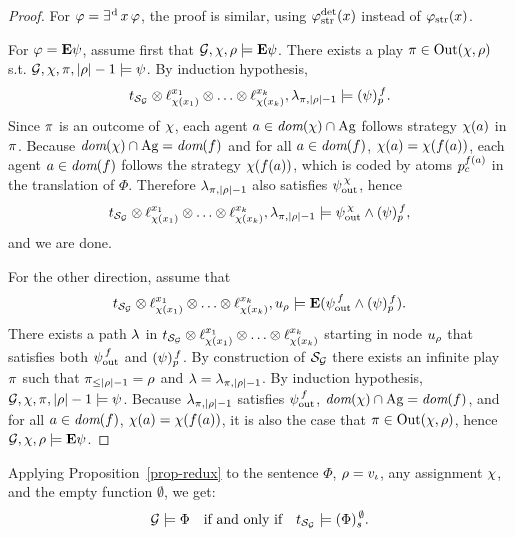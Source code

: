 \begin{proof}
For $\phi=\existsd\var\,\phi$, the proof is similar, using $\phistratdet$
instead of $\phistrat$.

 
\halfline
For $\phi=\Eout\psi$,
assume first that $\CGS,\assign,{\fplay}\models\E\psi$. 
There exists a play $\iplay\in\out(\assign,\fplay)$ s.t.
$\CGS,\assign,\iplay,|\fplay|-1\modelsSL \psi$. By induction
hypothesis,
\[\unfold[\KS_{\CGS}]{\sstate_{\pos_\init}}\prodlab
  \stratlab[\assign(\var_1)]{\var_1}\prodlab\ldots \prodlab
  \stratlab[\assign(\var_k)]{\var_k},\tpath_{\iplay,|\fplay|-1} \modelst
  \trp[f]{\psi}.\] Since $\iplay$ is an outcome of $\assign$, each agent $a\in\dom(\assign)\inter\Agf$ 
follows strategy $\assign(a)$ in $\iplay$.
Because  $\dom(\assign)\inter \Agf=\dom(f)$ and for all $a \in \dom(f)$,
  $\assign(a) = \assign(f(a))$, each agent $a\in\dom(f)$ follows
the  strategy $\assign(f(a))$, which is coded by atoms
$p_\mov^{f(\ag)}$ in the translation of $\Phi$. Therefore $\tpath_{\iplay,|\fplay|-1}$ also
satisfies $\psiout$, hence \[\unfold[\KS_{\CGS}]{\sstate_{\pos_\init}}\prodlab
  \stratlab[\assign(\var_1)]{\var_1}\prodlab\ldots \prodlab
  \stratlab[\assign(\var_k)]{\var_k},\tpath_{\iplay,|\fplay|-1} \modelst
  \psiout \et   \trp[f]{\psi},\] and we are done.

  For the other direction, assume that 
  \[\unfold[\KS_{\CGS}]{\sstate_{\pos_\init}}\prodlab
  \stratlab[\assign(\var_1)]{\var_1}\prodlab\ldots \prodlab
  \stratlab[\assign(\var_k)]{\var_k},\noeud_\fplay \modelst
  \E(\psiout[f] \et   \trp[f]{\psi}).\]
There exists a path $\tpath$ in $\unfold[\KS_{\CGS}]{\sstate_{\pos_\init}}\prodlab
  \stratlab[\assign(\var_1)]{\var_1}\prodlab\ldots \prodlab
  \stratlab[\assign(\var_k)]{\var_k}$ starting in
node $\noeud_\fplay$ that satisfies both $\psiout[f]$ and $\trp[f]{\psi}$.
By construction of $\KS_{\CGS}$ there exists an infinite play $\iplay$
such that $\iplay_{\leq |\fplay|-1}=\fplay$ and $\tpath=\tpath_{\iplay,|\fplay|-1}$.
By induction hypothesis, $\CGS,\assign,\iplay,|\fplay|-1 \modelsSL \psi$.
Because $\tpath_{\iplay,|\fplay|-1}$ satisfies $\psiout[f]$, $\dom(\assign)\inter \Agf=\dom(f)$, and for all $a \in \dom(f)$,
  $\assign(a) = \assign(f(a))$, it is also the case that
  $\iplay\in\out(\assign,\fplay)$, 
hence  $\CGS,\assign,\fplay \modelsSL \Eout\psi$.

 \end{proof}
 
 Applying Proposition~\ref{prop-redux} to the sentence $\Phi$, $\fplay=\pos_\init$, any assignment $\assign$, and
 the empty function $\emptyset$, we get:
 \[\CGS \models \Phi \quad \mbox{if and only if}\quad
\unfold[\KS_{\CGS}]{} \models
 \tr[\emptyset]{\Phi}.\]

